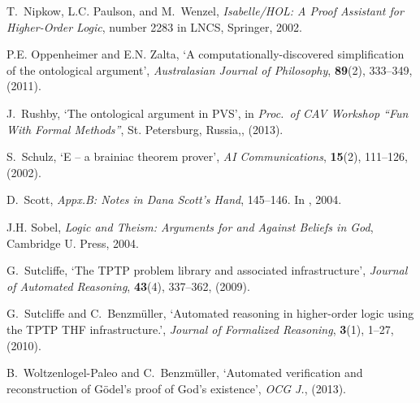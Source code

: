 \documentclass{birkjour}
\theoremstyle{definition}
\theoremstyle{remark}
\numberwithin{equation}{section}
\begin{document}
\begin{thebibliography}{1}
T.~Nipkow, L.C. Paulson, and M.~Wenzel, {\em {Isabelle/HOL: A Proof Assistant
  for Higher-Order Logic}}, number 2283 in LNCS, Springer, 2002.

P.E. Oppenheimer and E.N. Zalta, `A computationally-discovered simplification
  of the ontological argument', {\em Australasian Journal of Philosophy}, {\bf
  89}(2),  333--349, (2011).

J.~Rushby, `The ontological argument in {PVS}', in {\em Proc.~of CAV Workshop
  ``Fun With Formal Methods''}, St. Petersburg, Russia,, (2013).

S.~Schulz, `E -- a brainiac theorem prover', {\em {AI Communications}}, {\bf
  15}(2),  111--126, (2002).

D.~Scott, {\em Appx.B: Notes in Dana Scott's Hand},  145--146.
\newblock In  \cite{sobel2004logic}, 2004.

J.H. Sobel, {\em Logic and Theism: Arguments for and Against Beliefs in God},
  Cambridge U. Press, 2004.

G.~Sutcliffe, `The {TPTP} problem library and associated infrastructure', {\em
  Journal of Automated Reasoning}, {\bf 43}(4),  337--362, (2009).

G.~Sutcliffe and C.~Benzm{\"u}ller, `Automated reasoning in higher-order logic
  using the {TPTP THF} infrastructure.', {\em Journal of Formalized Reasoning},
  {\bf 3}(1),  1--27, (2010).

B.~Woltzenlogel-Paleo and C.~Benzm{\"u}ller, `Automated verification and
  reconstruction of {G\"odel's} proof of {God's} existence', {\em OCG J.},
  (2013).

\end{thebibliography}


\end{document}
